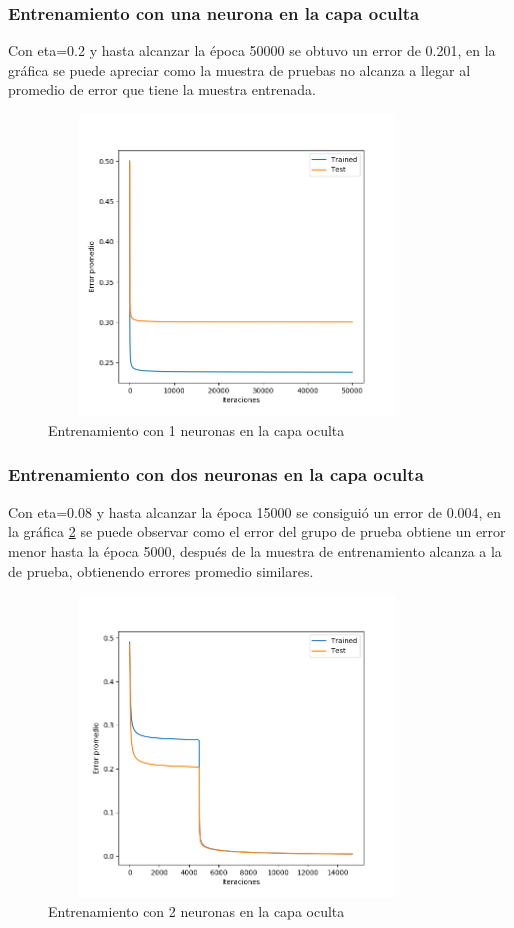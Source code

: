 \documentclass[11pt]{article}
\begin{document}
\subsubsection{Entrenamiento con una neurona en la capa oculta}
Con eta=0.2 y hasta alcanzar la \'epoca 50000 se obtuvo un error de 0.201, en la gráfica se puede apreciar como la muestra de pruebas no alcanza a llegar al promedio de error que tiene la muestra entrenada.
\begin{figure}[H]
    \includegraphics[width=10cm, height=8cm]{result_1hn}
    \centering
    \caption{Entrenamiento con 1 neuronas en la capa oculta}
    \label{fig:result_1hn}
\end{figure}
\subsubsection{Entrenamiento con dos neuronas en la capa oculta}
Con eta=0.08 y hasta alcanzar la \'epoca 15000 se consigui\'o un error de 0.004, en la gráfica \ref{fig:result_2hn} se puede observar como el error del grupo de prueba obtiene un error menor hasta la \'epoca 5000, despu\'es de la muestra de entrenamiento alcanza a la de prueba, obtienendo errores promedio similares.
\begin{figure}[H]
    \includegraphics[width=10cm, height=8cm]{result_2hn}
    \centering
    \caption{Entrenamiento con 2 neuronas en la capa oculta}
    \label{fig:result_2hn}
\end{figure}
\end{document}
